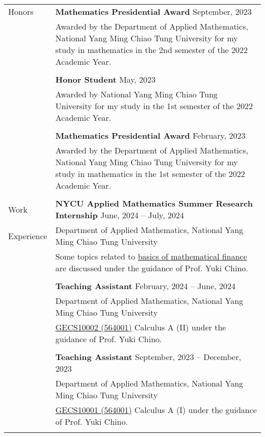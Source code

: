 \documentclass[letterpaper, 11pt]{article}
\begin{document}
\begin{longtable}{p{0.8in}p{5.5in}}
{\textcolor{OliveGreen}{Honors}}
& \textbf{Mathematics Presidential Award} \hfill September, 2023\\
& Awarded by the Department of Applied Mathematics, National Yang Ming Chiao Tung University for my study in mathematics in the 2nd semester of the 2022 Academic Year.\\
& \\
& \textbf{Honor Student} \hfill May, 2023\\
& Awarded by National Yang Ming Chiao Tung University for my study in the 1st semester of the 2022 Academic Year. \\
& \\
& \textbf{Mathematics Presidential Award} \hfill February, 2023\\
& Awarded by the Department of Applied Mathematics, National Yang Ming Chiao Tung University for my study in mathematics in the 1st semester of the 2022 Academic Year.\\
& \\


{\textcolor{OliveGreen}{Work}} & \textbf{NYCU Applied Mathematics Summer Research Internship} \hfill June, 2024 -- July, 2024 \\
{\textcolor{OliveGreen}{Experience}} & Department of Applied Mathematics, National Yang Ming Chiao Tung University \\
& Some topics related to \href{https://hackmd.io/@eiken-sc11/B1QcaW3B0}{basics of mathematical finance} are discussed under the guidance of Prof. Yuki Chino.\\
& \\

& \textbf{Teaching Assistant}  \hfill February, 2024 -- June, 2024 \\
 
& Department of Applied Mathematics, National Yang Ming Chiao Tung University\\
& \href{https://reurl.cc/RqoMez}{GECS10002 (564001)} Calculus A (II) under the guidance of Prof. Yuki Chino. \\
& \\

& \textbf{Teaching Assistant} \hfill September, 2023 -- December, 2023 \\
& Department of Applied Mathematics, National Yang Ming Chiao Tung University\\
& \href{https://reurl.cc/Djp5jN}{GECS10001 (564001)} Calculus A (I) under the guidance of Prof. Yuki Chino.\\
& \\


\end{longtable}
\end{document}

